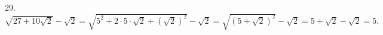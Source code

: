 29. $\sqrt{27+10\sqrt{2}}-\sqrt{2}=\sqrt{5^2+2\cdot5\cdot\sqrt{2}+(\sqrt{2})^2}-\sqrt{2}=\sqrt{(5+\sqrt{2})^2}-\sqrt{2}=
5+\sqrt{2}-\sqrt{2}=5.$\\
